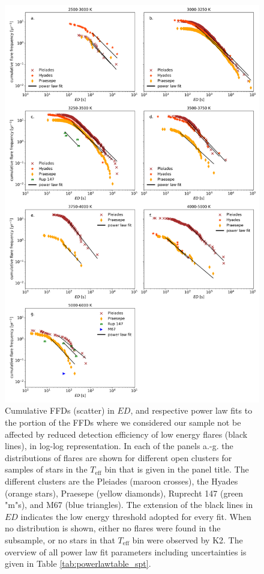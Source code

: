 \documentclass{aa}
\begin{document}
\begin{figure}[ht!]
    \centering
    \includegraphics[width=14cm]{pics/FFDs/SpT_wise_sample_ffd_ED_wheatland.png}
    \caption{Cumulative FFDs (scatter) in $ED$, and respective power law fits to the portion of the FFDs where we considered our sample not be affected by reduced detection efficiency of low energy flares (black lines), in log-log representation. In each of the panels a.-g. the distributions of flares are shown for different open clusters for samples of stars in the $T_\mathrm{eff}$ bin that is given in the panel title. The different clusters are the Pleiades (maroon crosses), the Hyades (orange stars), Praesepe (yellow diamonds), Ruprecht 147 (green "m"s), and M67 (blue triangles). The extension of the black lines in $ED$ indicates the low energy threshold adopted for every fit. When no distribution is shown, either no flares were found in the subsample, or no stars in that $T_\mathrm{eff}$ bin were observed by K2. The overview of all power law fit parameters including uncertainties is given in Table \ref{tab:powerlawtable_spt}.}       	
    \label{fig:powerlawfits_s}
\end{figure}
\end{document}
